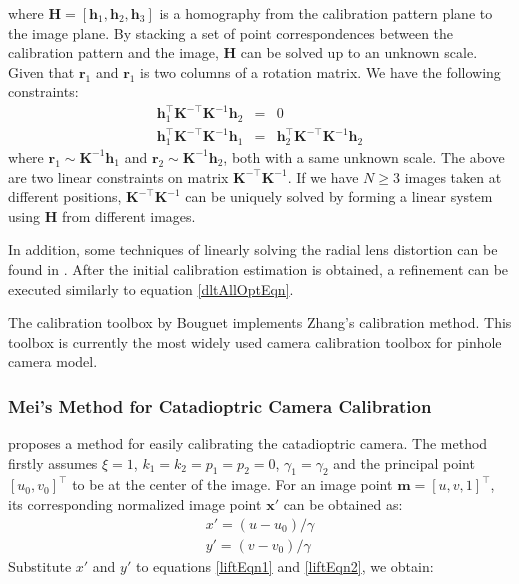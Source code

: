 \documentclass{report}
\begin{document}
where $\mathbf{H} = [\mathbf{h}_1, \mathbf{h}_2, \mathbf{h}_3]$ is a homography from the calibration pattern plane to the image plane. By stacking a set of point correspondences between the calibration pattern and the image, $\mathbf{H}$ can be solved up to an unknown scale. Given that $\mathbf{r}_1$ and $\mathbf{r}_1$ is two columns of a rotation matrix. We have the following constraints: 
\begin{eqnarray}
\mathbf{h}_1^\top \mathbf{K}^{-\top} \mathbf{K}^{-1} \mathbf{h}_2 &=& 0 \\
\mathbf{h}_1^\top \mathbf{K}^{-\top} \mathbf{K}^{-1} \mathbf{h}_1 &=& \mathbf{h}_2^\top \mathbf{K}^{-\top} \mathbf{K}^{-1} \mathbf{h}_2
\end{eqnarray}
where $\mathbf{r}_1 \sim \mathbf{K}^{-1} \mathbf{h}_1$ and $\mathbf{r}_2 \sim \mathbf{K}^{-1} \mathbf{h}_2$, both with a same unknown scale. The above are two linear constraints on matrix $\mathbf{K}^{-\top} \mathbf{K}^{-1}$. If we have $N \geq 3$ images taken at different positions, $\mathbf{K}^{-\top} \mathbf{K}^{-1}$ can be uniquely solved by forming a linear system using $\mathbf{H}$ from different images. 

In addition, some techniques of linearly solving the radial lens distortion can be found in \cite{zhang2000flexible}. After the initial calibration estimation is obtained, a refinement can be executed similarly to equation \ref{dltAllOptEqn}. 

The calibration toolbox by Bouguet \cite{bouguet2004camera} implements Zhang's calibration method. This toolbox is currently the most widely used camera calibration toolbox for pinhole camera model. 

\subsubsection{Mei's Method for Catadioptric Camera Calibration}
\cite{mei2007single} proposes a method for easily calibrating the catadioptric camera. The method firstly assumes $\xi = 1$, $k_1 = k_2 = p_1 = p_2 = 0$, $\gamma_1 = \gamma_2$ and the principal point $[u_0, v_0]^\top$ to be at the center of the image. For an image point $\mathbf{m} = [u, v, 1]^\top$, its corresponding normalized image point $\mathbf{x}'$ can be obtained as:
\begin{eqnarray}
x' = (u - u_0) / \gamma \\
y' = (v - v_0) / \gamma
\end{eqnarray}
Substitute $x'$ and $y'$ to equations \ref{liftEqn1} and \ref{liftEqn2}, we obtain: 
\end{document}
